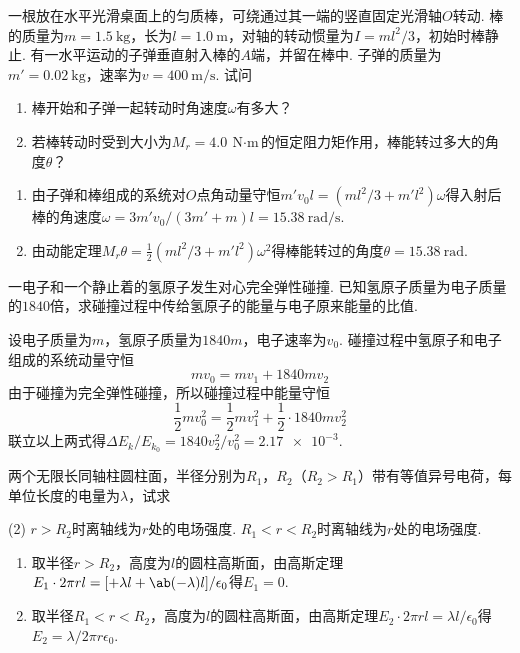 \begin{problem}
    一根放在水平光滑桌面上的匀质棒，可绕通过其一端的竖直固定光滑轴$O$转动. 棒的质量为$m=\qty{1.5}\kg$，长为$l=\qty{1.0}\m$，对轴的转动惯量为$I=ml^2/3$，初始时棒静止. 有一水平运动的子弹垂直射入棒的$A$端，并留在棒中. 子弹的质量为$m'=\qty{0.02}\kg$，速率为$v=\qty{400}{\m/\s}$. 试问
    \begin{enumerate}
        \item 棒开始和子弹一起转动时角速度$\omega$有多大？
        \item 若棒转动时受到大小为$M_r=\qty{4.0}{\N\cdot\m}$的恒定阻力矩作用，棒能转过多大的角度$\theta$？
    \end{enumerate}
\end{problem}
\begin{solution}\leavevmode
    \begin{enumerate}
        \item 由子弹和棒组成的系统对$O$点角动量守恒$m'v_0l=(ml^2/3+m'l^2)\omega$得入射后棒的角速度$\omega=3m'v_0/(3m'+m)l=\qty{15.38}{\radian/\s}$.
        \item 由动能定理$M_r\theta=\frac12(ml^2/3+m'l^2)\omega^2$得棒能转过的角度$\theta=\qty{15.38}{\radian}$.
    \end{enumerate}
\end{solution}

\begin{problem} %
    一电子和一个静止着的氢原子发生对心完全弹性碰撞. 已知氢原子质量为电子质量的$1840$倍，求碰撞过程中传给氢原子的能量与电子原来能量的比值.
\end{problem}
\begin{solution}
    设电子质量为$m$，氢原子质量为$1840m$，电子速率为$v_0$. 碰撞过程中氢原子和电子组成的系统动量守恒
    \[mv_0=mv_1+1840mv_2\]
    由于碰撞为完全弹性碰撞，所以碰撞过程中能量守恒
    \[\frac12mv_0^2=\frac12mv_1^2+\frac12\cdot 1840 mv_2^2\]
    联立以上两式得$\Delta E_k/E_{k_0}=1840v_2^2/v_0^2=\num{2.17e-3}$.
\end{solution}

\begin{problem}
    两个无限长同轴柱圆柱面，半径分别为$R_1$，$R_2$（$R_2>R_1$）带有等值异号电荷，每单位长度的电量为$\lambda$，试求
    \begin{tasks}[label=\arabic*.](2)
        \task $r>R_2$时离轴线为$r$处的电场强度.
        \task $R_1<r<R_2$时离轴线为$r$处的电场强度.
    \end{tasks}
\end{problem}
\begin{solution}\leavevmode
    \begin{enumerate}
        \item 取半径$r>R_2$，高度为$l$的圆柱高斯面，由高斯定理$E_1\cdot 2\pi rl=[+\lambda l+\ab(-\lambda)l]/\epsilon_0$得$E_1=0$.
        \item 取半径$R_1<r<R_2$，高度为$l$的圆柱高斯面，由高斯定理$E_2\cdot 2\pi rl=\lambda l/\epsilon_0$得$E_2=\lambda/2\pi r\epsilon_0$.
    \end{enumerate}
\end{solution}

